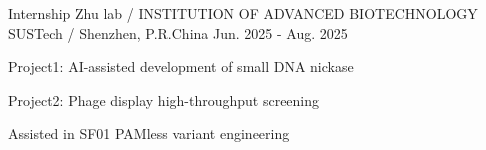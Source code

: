 
\begin{cventries}
    \cventry
    {Internship} %
    {Zhu lab / INSTITUTION OF ADVANCED BIOTECHNOLOGY} %
    {SUSTech / Shenzhen, P.R.China} %
    {Jun. 2025 - Aug. 2025} %
    {
      \begin{cvitems} %
        \item {Project1: AI-assisted development of small DNA nickase}
        \item {Project2: Phage display high-throughput screening}
        \item {Assisted in SF01 PAMless variant engineering}
      \end{cvitems}
    }



\end{cventries}